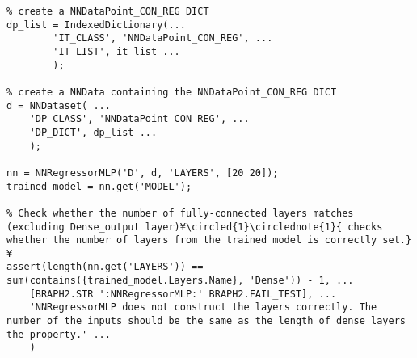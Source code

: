 \documentclass{tufte-handout}
\begin{document}
\begin{lstlisting}
% create a NNDataPoint_CON_REG DICT
dp_list = IndexedDictionary(...
        'IT_CLASS', 'NNDataPoint_CON_REG', ...
        'IT_LIST', it_list ...
        );

% create a NNData containing the NNDataPoint_CON_REG DICT
d = NNDataset( ...
    'DP_CLASS', 'NNDataPoint_CON_REG', ...
    'DP_DICT', dp_list ...
    );

nn = NNRegressorMLP('D', d, 'LAYERS', [20 20]);
trained_model = nn.get('MODEL');

% Check whether the number of fully-connected layers matches (excluding Dense_output layer)¥\circled{1}\circlednote{1}{ checks whether the number of layers from the trained model is correctly set.}¥
assert(length(nn.get('LAYERS')) == sum(contains({trained_model.Layers.Name}, 'Dense')) - 1, ...
    [BRAPH2.STR ':NNRegressorMLP:' BRAPH2.FAIL_TEST], ...
    'NNRegressorMLP does not construct the layers correctly. The number of the inputs should be the same as the length of dense layers the property.' ...
    )

\end{lstlisting}

%
%
\end{document}

